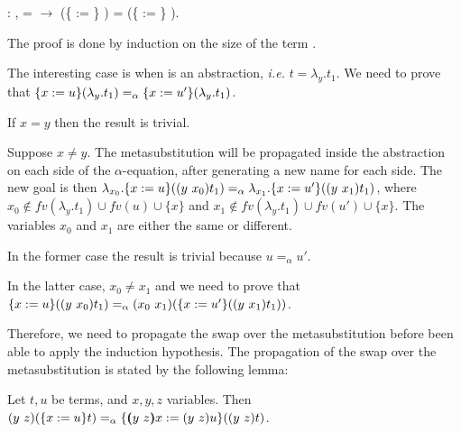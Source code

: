 \begin{coqdoccode}
\coqdocemptyline
\coqdocnoindent
{} : \coqdockw{\ensuremath{\forall}}    ,  =  \ensuremath{\rightarrow} (\{ := \} ) = (\{ := \} ).\coqdoceol
\end{coqdoccode}
 The proof is done by induction on the size of the term .
\begin{coqdoccode}
\end{coqdoccode}
The interesting case is when  is an abstraction, {\it i.e.} $t = \lambda_y.t_1$. We need to prove that $\metasub{(\lambda_y.t_1)}{x}{u} =_\alpha \metasub{(\lambda_y.t_1)}{x}{u'}$.
\begin{coqdoccode}
\end{coqdoccode}
If $x = y$ then the result is trivial.
\begin{coqdoccode}
\end{coqdoccode}
Suppose $x \neq y$. The metasubstitution will be propagated inside the abstraction on each side of the $\alpha$-equation, after generating a new name for each side. The new goal is then $\lambda_{x_0}.\metasub{(\swap{y}{x_0}{t_1})}{x}{u} =_\alpha \lambda_{x_1}.\metasub{(\swap{y}{x_1}{t_1})}{x}{u'}$, where $x_0 \notin fv(\lambda_y.t_1) \cup fv(u) \cup \{x\}$ and $x_1 \notin fv(\lambda_y.t_1) \cup fv(u') \cup \{x\}$. The variables $x_0$ and $x_1$ are either the same or different.
\begin{coqdoccode}
\end{coqdoccode}
In the former case the result is trivial because $u =_\alpha u'$. 
\begin{coqdoccode}
\end{coqdoccode}
In the latter case, $x_0 \neq x_1$ and we need to prove that $\metasub{(\swap{y}{x_0}{t_1})}{x}{u} =_\alpha \swap{x_0}{x_1}{(\metasub{(\swap{y}{x_1}{t_1})}{x}{u'})}$.
\begin{coqdoccode}
\end{coqdoccode}
Therefore, we need to propagate the swap over the metasubstitution before been able to apply the induction hypothesis. The propagation of the swap over the metasubstitution is stated by the following lemma:


\begin{lemma} Let $t,u$ be terms, and $x,y,z$ variables. Then
 $\swap{y}{z}{(\metasub{t}{x}{u})} =_\alpha \metasub{(\swap{y}{z}{t})}{\vswap{y}{z}{x}}{\swap{y}{z}{u}}$.
\end{lemma}


